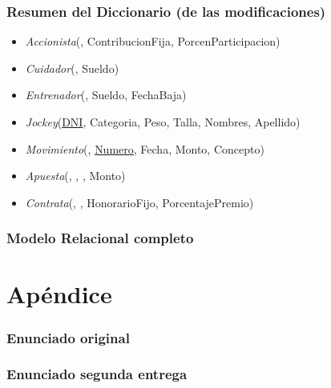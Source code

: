 \documentclass[a4paper,11pt]{article}
\begin{document}
\section{Resumen del Diccionario (de las modificaciones)}

\begin{itemize}

  \item \emph{Accionista}(\uline{}, ContribucionFija, 
    PorcenParticipacion)

  \item \emph{Cuidador}(\uline{}, Sueldo)

  \item \emph{Entrenador}(\uline{}, Sueldo, FechaBaja)

  \item \emph{Jockey}(\uline{DNI}, Categoria, Peso, Talla, Nombres, Apellido)

  \item \emph{Movimiento}(\uline{}, \uline{Numero}, Fecha, Monto, Concepto)

  \item \emph{Apuesta}(\uline{}, \uline{}, \uline{}, Monto)
  
  \item \emph{Contrata}(\uline{}, \uline{}, HonorarioFijo, PorcentajePremio) 

\end{itemize}


\section{Modelo Relacional completo}


\part{Apéndice}
\appendix

\section{Enunciado original}\label{sec:enunciado}


\section{Enunciado segunda entrega}\label{sec:enunciado}

\end{document}
